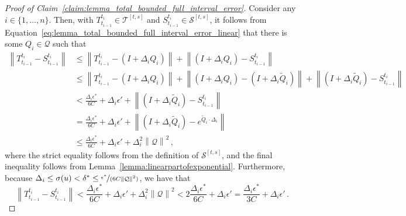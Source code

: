 \documentclass[10pt]{paper}
\theoremstyle{definition}
\newcommand{\rateset}{\mathcal{Q}}
\newcommand{\norm}[1]{\left\lVert #1 \right\rVert}
\begin{document}
\begin{proof}[Proof of Claim~\ref{claim:lemma_total_bounded_full_interval_error}]
Consider any $i\in\{1,\ldots,n\}$. Then, with $T_{t_{i-1}}^{t_i}\in\mathcal{T}^{[t,s]}$ and $S_{t_{i-1}}^{t_i}\in\mathcal{S}^{[t,s]}$, it follows from Equation~\eqref{eq:lemma_total_bounded_full_interval_error_linear} that there is some $Q_i\in\rateset$ such that
\begin{align*}
\norm{T_{t_{i-1}}^{t_i} - S_{t_{i-1}}^{t_i}} &\leq \norm{T_{t_{i-1}}^{t_i} - (I+\Delta_iQ_i)} + \norm{(I+\Delta_iQ_i) - S_{t_{i-1}}^{t_i}} \\
 &\leq \norm{T_{t_{i-1}}^{t_i} - (I+\Delta_iQ_i)} + \norm{(I+\Delta_iQ_i) - (I+\Delta_i\widetilde{Q}_i)} + \norm{(I+\Delta_i\widetilde{Q}_i) - S_{t_{i-1}}^{t_i}} \\
 &< \frac{\Delta_i\epsilon^*}{6C} + \Delta_i\epsilon' + \norm{(I+\Delta_i\widetilde{Q}_i) - S_{t_{i-1}}^{t_i}} \\
 &= \frac{\Delta_i\epsilon^*}{6C} + \Delta_i\epsilon' + \norm{(I+\Delta_i\widetilde{Q}_i) - e^{\widetilde{Q}_i\cdot\Delta_i}} \\
 &\leq \frac{\Delta_i\epsilon^*}{6C} + \Delta_i\epsilon' + \Delta_i^2\norm{\rateset}^2\,,
\end{align*}
where the strict equality follows from the definition of $\mathcal{S}^{[t,s]}$, and the final inequality follows from Lemma~\ref{lemma:linearpartofexponential}. Furthermore, because $\Delta_i\leq\sigma(u)<\delta^*\leq\nicefrac{\epsilon^*}{(6C\norm{\rateset}^2)}$, we have that
\begin{equation*}
\norm{T_{t_{i-1}}^{t_i} - S_{t_{i-1}}^{t_i}} < \frac{\Delta_i\epsilon^*}{6C} + \Delta_i\epsilon' + \Delta_i^2\norm{\rateset}^2 < 2\frac{\Delta_i\epsilon^*}{6C} + \Delta_i\epsilon' = \frac{\Delta_i\epsilon^*}{3C} + \Delta_i\epsilon'\,.
\end{equation*}
\end{proof}
\end{document}
